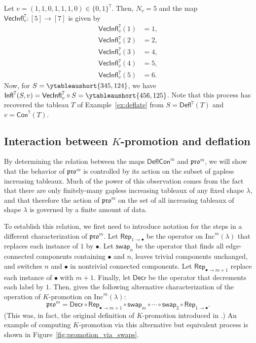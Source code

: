 \documentclass[12pt]{amsart}
\theoremstyle{definition}
\newenvironment{example}
  {\pushQED{\qed}\renewcommand{\qedsymbol}{$\diamondsuit$}\examplex}
  {\popQED\endexamplex}
\theoremstyle{remark}
\numberwithin{equation}{section}
\newcommand{\inc}{\ensuremath{\mathrm{Inc}}}
\newcommand{\pro}{\mathfrak{pro}}
\newcommand{\swap}{\ensuremath{\mathsf{swap}}}
\newcommand{\decr}{\ensuremath{\mathsf{Decr}}}
\newcommand{\rep}{\ensuremath{\mathsf{Rep}}}
\newcommand{\deflate}{\ensuremath{\mathsf{Defl}}}
\newcommand{\inflate}{\ensuremath{\mathsf{VecInfl}}}
\newcommand{\tinflate}{\ensuremath{\mathsf{Infl}}}
\newcommand{\content}{\ensuremath{\mathsf{Con}}}
\newcommand{\compress}{\ensuremath{\mathsf{DeflCon}}}
\begin{document}
\begin{example}\label{ex:reinflate}
Let $v = (1,1,0,1,1,1,0) \in \{0,1\}^7$. Then, $N_v = 5$ and the map $\inflate^7_v : [5] \to [7]$ is given by 
\begin{align*}
\inflate^7_v(1) &= 1, \\
\inflate^7_v(2) &= 2, \\
\inflate_v^7(3) &= 4, \\
\inflate_v^7(4) &= 5, \\
\inflate_v^7(5) &= 6. 
\end{align*}
Now, for $S = \ytableaushort{345,124}$, we have $\tinflate^7(S,v) = \inflate^7_v \circ S = \ytableaushort{456,125}$. Note that this process has recovered the tableau $T$ of Example~\ref{ex:deflate} from $S=\deflate^7(T)$ and $v=\content^7(T)$.
\end{example}

\subsection{Interaction between $K$-promotion and deflation}
By determining the relation between the maps $\compress^m$ and $\pro^m$, we will show that the behavior of $\pro^m$ is controlled by its action on the subset of gapless increasing tableaux. Much of the power of this observation comes from the fact that there are only finitely-many gapless increasing tableaux of any fixed shape $\lambda$, and that therefore the action of $\pro^m$ on the set of all increasing tableaux of shape $\lambda$ is governed by a finite amount of data.


To establish this relation, we first need to introduce notation for the steps in a different characterization of $\pro^m$. Let $\rep_{1 \rightarrow \bullet}$ be the operator on $\inc^m(\lambda)$ that replaces each instance of $1$ by $\bullet$. Let $\swap_n$ be the operator that finds all edge-connected components containing $\bullet$ and $n$, leaves trivial components unchanged, and switches $n$ and $\bullet$ in nontrivial connected components. Let $\rep_{\bullet \rightarrow m+1}$ replace each instance of $\bullet$ with $m+1$. Finally, let $\decr$ be the operator that decrements each label by $1$. Then, \cite[Proposition~2.4]{DPS} gives the following alternative characterization of the operation of $K$-promotion on $\inc^m(\lambda)$: 
\begin{equation}\label{eq:kprodef2}
\pro^m = \decr \circ \rep_{\bullet \rightarrow m+1} \circ \swap_m \circ \cdots \circ \swap_2 \circ \rep_{1 \rightarrow \bullet}.
\end{equation}
 (This was, in fact, the original definition of $K$-promotion introduced in \cite{Pechenik}.) An example of computing $K$-promotion via this alternative but equivalent process is shown in Figure~\ref{fig:promotion_via_swaps}.
 
\end{document}

